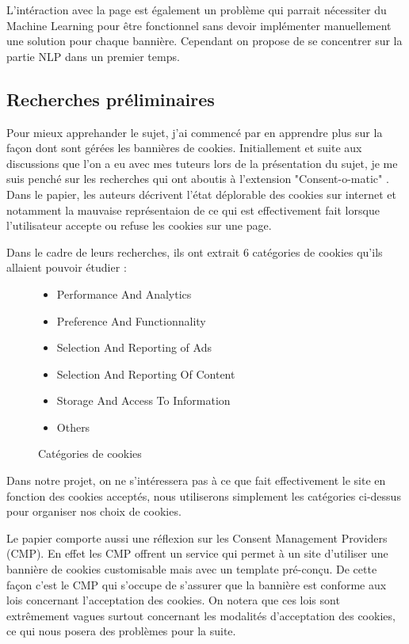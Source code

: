 \documentclass[oneside,a4paper,12pt]{article}
\begin{document}
	L'intéraction avec la page est également un problème qui parrait nécessiter du Machine Learning pour être fonctionnel sans devoir implémenter manuellement une solution pour chaque bannière. Cependant on propose de se concentrer sur la partie NLP dans un premier temps.
	
	\subsection{Recherches préliminaires}
	
	Pour mieux apprehander le sujet, j'ai commencé par en apprendre plus sur la façon dont sont gérées les bannières de cookies. 
	Initiallement et suite aux discussions que l'on a eu avec mes tuteurs lors de la présentation du sujet, je me suis penché sur les recherches qui ont aboutis à l'extension "Consent-o-matic" \cite{consentomatic}.
	Dans le papier, les auteurs décrivent l'état déplorable des cookies sur internet et notamment la mauvaise représentaion de ce qui est effectivement fait lorsque l'utilisateur accepte ou refuse les cookies sur une page.
	
	Dans le cadre de leurs recherches, ils ont extrait 6 catégories de cookies qu'ils allaient pouvoir étudier :
	\begin{figure}[h]
		\centering
		\label{categories}
		\begin{itemize}
			\centering
			\item Performance And Analytics
			\item Preference And Functionnality
			\item Selection And Reporting of Ads
			\item Selection And Reporting Of Content
			\item Storage And Access To Information
			\item Others
		\end{itemize}
		\caption{Catégories de cookies}
	\end{figure}
	
	Dans notre projet, on ne s'intéressera pas à ce que fait effectivement le site en fonction des cookies acceptés, nous utiliserons simplement les catégories ci-dessus pour organiser nos choix de cookies.
	
	Le papier comporte aussi une réflexion sur les Consent Management Providers (CMP). En effet les CMP offrent un service qui permet à un site d'utiliser une bannière de cookies customisable mais avec un template pré-conçu. De cette façon c'est le CMP qui s'occupe de s'assurer que la bannière est conforme aux lois concernant l'acceptation des cookies.
	On notera que ces lois sont extrêmement vagues surtout concernant les modalités d'acceptation des cookies, ce qui nous posera des problèmes pour la suite.
	
\end{document}
